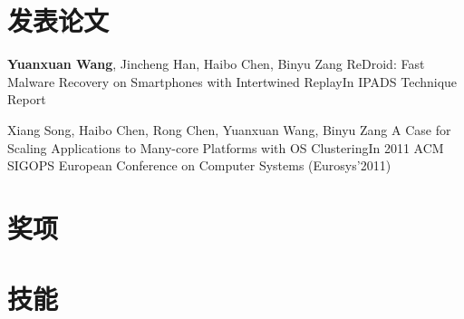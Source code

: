 \documentclass[11pt,a4paper]{moderncv}
\begin{document}
\renewcommand{\baselinestretch}{1.0}

\section{发表论文}
{\textbf{Yuanxuan Wang}\textnormal{, Jincheng Han, Haibo Chen, Binyu Zang}}
{ReDroid: Fast Malware Recovery on Smartphones with Intertwined Replay}{In IPADS Technique Report}
{}{}{}

{\textnormal{Xiang Song, Haibo Chen, Rong Chen, }Yuanxuan Wang\textnormal{, Binyu Zang}}
{A Case for Scaling Applications to Many-core Platforms with OS Clustering}{In 2011 ACM SIGOPS European Conference on Computer Systems (Eurosys'2011) }
{}{}{}


\section{奖项}

\section{技能}


\closesection{}                   %
\renewcommand{\listitemsymbol}{-} %
\end{document}

